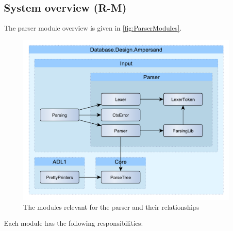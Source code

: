 
\subsection{System overview (R-M)}
  The parser module overview is given in \autoref{fig:ParserModules}.
  \begin{figure}[ht]%
    \centering
    \includegraphics[width=0.7\columnwidth]{Figures/ParserModules}
    \caption{The modules relevant for the parser and their relationships}
    \label{fig:ParserModules}
  \end{figure}%
  Each module has the following responsibilities:
